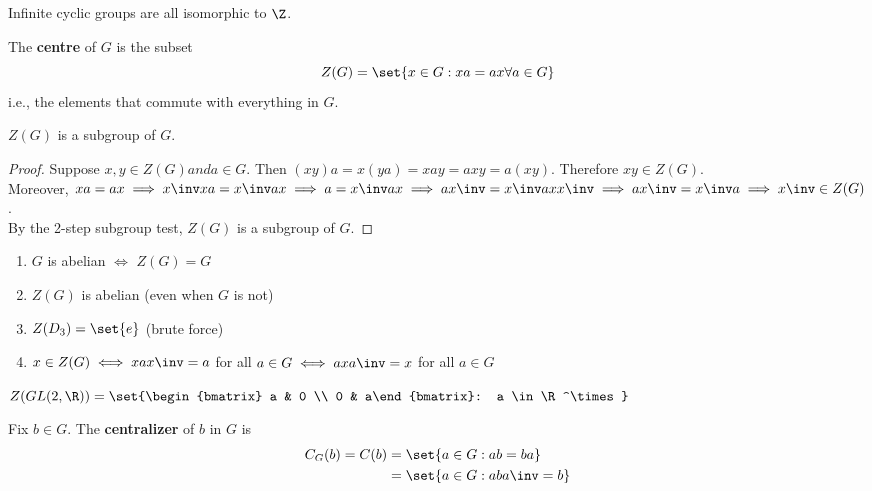 \begin{remark}
    Infinite cyclic groups are all isomorphic to $\Z$.
\end{remark}

\begin{definition}
    The \textbf{centre} of $G$ is the subset $$Z(G) = \set{x \in G: xa = ax \forall a \in G}$$ i.e., the elements that commute with everything in $G$.
\end{definition}

\begin{theorem}
    $Z(G)$ is a subgroup of $G$.
\end{theorem}
\begin{proof}
    Suppose $x,y \in Z(G) and a \in G$. Then $(xy)a = x(ya) = xay = axy = a(xy)$. Therefore $xy \in Z(G)$. \\
    Moreover, $xa=ax \implies x\inv xa = x\inv ax \implies a = x\inv ax \implies ax\inv = x\inv a xx\inv \implies ax\inv = x\inv a \implies x\inv \in Z(G)$. \\
    By the 2-step subgroup test, $Z(G)$ is a subgroup of $G$.
\end{proof}

\begin{remark}
    \begin{enumerate}
        \item $G$ is abelian $\iff$ $Z(G) = G$
        \item $Z(G)$ is abelian (even when $G$ is not)
        \item $Z(D_3) = \set{e}$ (brute force)
        \item $x \in Z(G) \iff x a x\inv = a$ for all $a \in G \iff a x a\inv = x$ for all $a \in G$
    \end{enumerate}
\end{remark}

\begin{example}
    $Z(GL(2,\R)) = \set{\begin{bmatrix} a & 0 \\ 0 & a\end{bmatrix}: a \in \R^\times}$
\end{example}

\begin{definition}
    Fix $b \in G$. The \textbf{centralizer} of $b$ in $G$ is \begin{align*}
        C_G(b) = C(b) &= \set{a \in G: ab = ba} \\
        &= \set{a \in G: aba\inv = b}
    \end{align*}
\end{definition}

